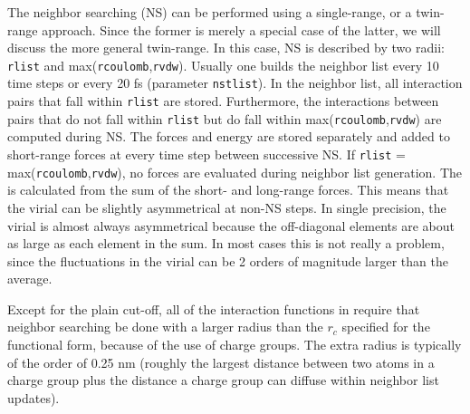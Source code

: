 The neighbor searching (NS) can be performed using a single-range, or a twin-range 
approach. Since the former is merely a special case of the latter, we will 
discuss the more general twin-range. In this case, NS is described by two
radii: {\tt rlist} and max({\tt rcoulomb},{\tt rvdw}).
Usually one builds the neighbor list every 10 time steps
or every 20 fs (parameter {\tt nstlist}). In the neighbor list, all interaction 
pairs that  fall within {\tt rlist} are stored. Furthermore, the 
interactions between pairs that do not
fall within {\tt rlist} but do fall within max({\tt rcoulomb},{\tt rvdw})
are computed during NS.  The
forces and energy are stored separately and added to short-range forces
at every time step between successive NS. If {\tt rlist} = 
max({\tt rcoulomb},{\tt rvdw}), no forces
are evaluated during neighbor list generation.
The  is calculated from the sum of the short- and
long-range forces.
This means that the virial can be slightly asymmetrical at non-NS steps.
In single precision, the virial is almost always asymmetrical because the
off-diagonal elements are about as large as each element in the sum.
In most cases this is not really a problem, since the fluctuations in the
virial can be 2 orders of magnitude larger than the average.

Except for the plain cut-off,
all of the interaction functions in 
require that neighbor searching be done with a larger radius than the $r_c$
specified for the functional form, because of the use of charge groups.
The extra radius is typically of the order of 0.25 nm (roughly the 
largest distance between two atoms in a charge group plus the distance a 
charge group can diffuse within neighbor list updates).


